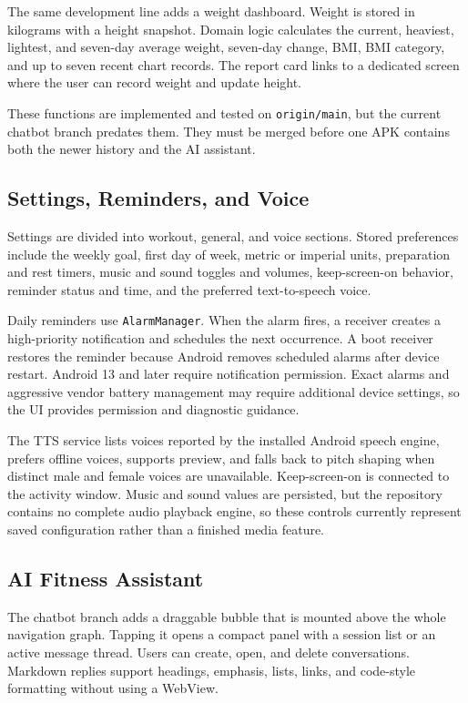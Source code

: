 The same development line adds a weight dashboard. Weight is stored in kilograms with a height snapshot. Domain logic calculates the current, heaviest, lightest, and seven-day average weight, seven-day change, BMI, BMI category, and up to seven recent chart records. The report card links to a dedicated screen where the user can record weight and update height.

These functions are implemented and tested on \texttt{origin/main}, but the current chatbot branch predates them. They must be merged before one APK contains both the newer history and the AI assistant.

\subsection{Settings, Reminders, and Voice}

Settings are divided into workout, general, and voice sections. Stored preferences include the weekly goal, first day of week, metric or imperial units, preparation and rest timers, music and sound toggles and volumes, keep-screen-on behavior, reminder status and time, and the preferred text-to-speech voice.

Daily reminders use \texttt{AlarmManager}. When the alarm fires, a receiver creates a high-priority notification and schedules the next occurrence. A boot receiver restores the reminder because Android removes scheduled alarms after device restart. Android 13 and later require notification permission. Exact alarms and aggressive vendor battery management may require additional device settings, so the UI provides permission and diagnostic guidance.

The TTS service lists voices reported by the installed Android speech engine, prefers offline voices, supports preview, and falls back to pitch shaping when distinct male and female voices are unavailable. Keep-screen-on is connected to the activity window. Music and sound values are persisted, but the repository contains no complete audio playback engine, so these controls currently represent saved configuration rather than a finished media feature.

\subsection{AI Fitness Assistant}

The chatbot branch adds a draggable bubble that is mounted above the whole navigation graph. Tapping it opens a compact panel with a session list or an active message thread. Users can create, open, and delete conversations. Markdown replies support headings, emphasis, lists, links, and code-style formatting without using a WebView.

